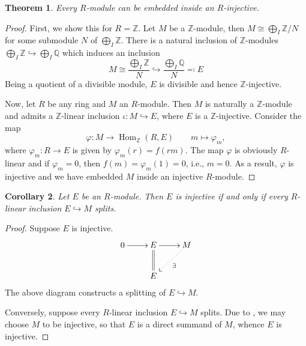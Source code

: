 \documentclass[10pt]{article}
\theoremstyle{thmstyle}
\newtheorem{theorem}{Theorem}[section]
\theoremstyle{defstyle}
\newtheorem{corollary}[theorem]{Corollary}
\newcommand{\Q}{\mathbb{Q}}
\newcommand{\Z}{\mathbb{Z}}
\newcommand{\Hom}{\operatorname{Hom}}
\newcommand{\into}{\hookrightarrow}
\begin{document}
\begin{theorem}
    Every $R$-module can be embedded inside an $R$-injective.
\end{theorem}
\begin{proof}
    First, we show this for $R = \Z$. Let $M$ be a $\Z$-module, then $M\cong \bigoplus_I \Z/N$ for some submodule $N$ of $\bigoplus_I \Z$. There is a natural inclusion of $\Z$-modules $\bigoplus_I\Z\into\bigoplus_I\Q$ which induces an inclusion
    \begin{equation*}
        M\cong\frac{\bigoplus_I\Z}{N}\into \frac{\bigoplus_I\Q}{N}\eqcolon E
    \end{equation*}
    Being a quotient of a divisible module, $E$ is divisible and hence $\Z$-injective. 

    Now, let $R$ be any ring and $M$ an $R$-module. Then $M$ is naturally a $\Z$-module and admits a $\Z$-linear inclusion $\iota: M\into E$, where $E$ is a $\Z$-injective. Consider the map 
    \begin{equation*}
        \varphi: M\longrightarrow\Hom_{\Z}(R, E)\qquad m\longmapsto\varphi_m,
    \end{equation*}
    where $\varphi_m: R\to E$ is given by $\varphi_m(r) = f(rm)$. The map $\varphi$ is obviously $R$-linear and if $\varphi_m = 0$, then $f(m) = \varphi_m(1) = 0$, i.e., $m = 0$. As a result, $\varphi$ is injective and we have embedded $M$ inside an injective $R$-module.
\end{proof}

\begin{corollary}
    Let $E$ be an $R$-module. Then $E$ is injective if and only if every $R$-linear inclusion $E\into M$ splits.
\end{corollary}
\begin{proof}
    Suppose $E$ is injective.
    \begin{equation*}
        \xymatrix {
            0\ar[r] & E\ar[r]\ar@{=}[d] & M\ar@{.>}[ld]^{\exists}\\
            & E & 
        }
    \end{equation*}
    The above diagram constructs a splitting of $E\into M$.

    Conversely, suppose every $R$-linear inclusion $E\into M$ splits. Due to , we may choose $M$ to be injective, so that $E$ is a direct summand of $M$, whence $E$ is injective.
\end{proof}
\end{document}
